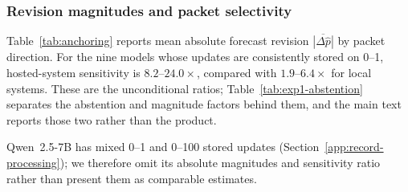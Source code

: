 \subsubsection{Revision magnitudes and packet selectivity}
Table~\ref{tab:anchoring} reports mean absolute forecast revision
\(\overline{|\Delta\hat p|}\) by packet direction.  For the nine models whose updates
are consistently stored on 0--1, hosted-system sensitivity is $8.2$--$24.0\times$,
compared with $1.9$--$6.4\times$ for local systems. These are the unconditional
ratios; Table~\ref{tab:exp1-abstention} separates the abstention and magnitude
factors behind them, and the main text reports those two rather than the product.

Qwen~2.5-7B has mixed 0--1 and 0--100 stored updates
(Section~\ref{app:record-processing}); we therefore omit its absolute magnitudes
and sensitivity ratio rather than present them as comparable estimates.

